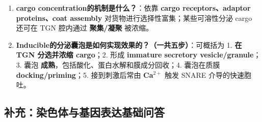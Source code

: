 \documentclass[12pt,fontset=none]{ctexart}
\begin{document}
\begin{enumerate}
\item \textbf{cargo concentration的机制是什么？}：依靠 \textbf{cargo receptors、adaptor proteins、coat assembly} 对货物进行选择性富集；某些可溶性分泌 cargo 还可在 TGN 腔内通过 \textbf{聚集/凝聚} 被浓缩。

\item \textbf{Inducible的分泌囊泡是如何实现效果的？（一共五步）}：可概括为 1. \textbf{在 TGN 分选并浓缩 cargo}；2. 形成 \textbf{immature secretory vesicle/granule}；3. 囊泡 \textbf{成熟}，包括酸化、蛋白水解和膜成分回收；4. 囊泡在质膜 \textbf{docking/priming}；5. 接到刺激后常由 \textbf{Ca$^{2+}$} 触发 SNARE 介导的快速胞吐。

\end{enumerate}

\subsection*{补充：染色体与基因表达基础问答}
\end{document}
